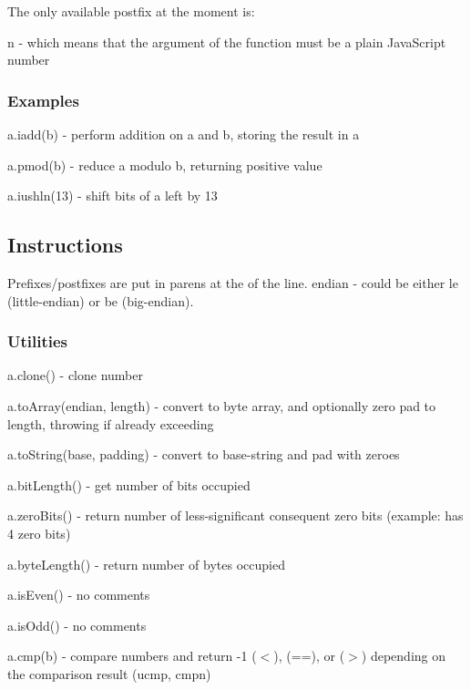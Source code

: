The only available postfix at the moment is\+:


\begin{DoxyItemize}
\item {\ttfamily n} -\/ which means that the argument of the function must be a plain Java\+Script number
\end{DoxyItemize}

\subsubsection*{Examples}


\begin{DoxyItemize}
\item {\ttfamily a.\+iadd(b)} -\/ perform addition on {\ttfamily a} and {\ttfamily b}, storing the result in {\ttfamily a}
\item {\ttfamily a.\+pmod(b)} -\/ reduce {\ttfamily a} modulo {\ttfamily b}, returning positive value
\item {\ttfamily a.\+iushln(13)} -\/ shift bits of {\ttfamily a} left by 13
\end{DoxyItemize}

\subsection*{Instructions}

Prefixes/postfixes are put in parens at the of the line. {\ttfamily endian} -\/ could be either {\ttfamily le} (little-\/endian) or {\ttfamily be} (big-\/endian).

\subsubsection*{Utilities}


\begin{DoxyItemize}
\item {\ttfamily a.\+clone()} -\/ clone number
\item {\ttfamily a.\+to\+Array(endian, length)} -\/ convert to byte array, and optionally zero pad to length, throwing if already exceeding
\item {\ttfamily a.\+to\+String(base, padding)} -\/ convert to base-\/string and pad with zeroes
\item {\ttfamily a.\+bit\+Length()} -\/ get number of bits occupied
\item {\ttfamily a.\+zero\+Bits()} -\/ return number of less-\/significant consequent zero bits (example\+: {} has 4 zero bits)
\item {\ttfamily a.\+byte\+Length()} -\/ return number of bytes occupied
\item {\ttfamily a.\+is\+Even()} -\/ no comments
\item {\ttfamily a.\+is\+Odd()} -\/ no comments
\item {\ttfamily a.\+cmp(b)} -\/ compare numbers and return {\ttfamily -\/1} ({\ttfamily $<$}), {} ({\ttfamily ==}), or {} ({\ttfamily $>$}) depending on the comparison result ({\ttfamily ucmp}, {\ttfamily cmpn})
\end{DoxyItemize}

